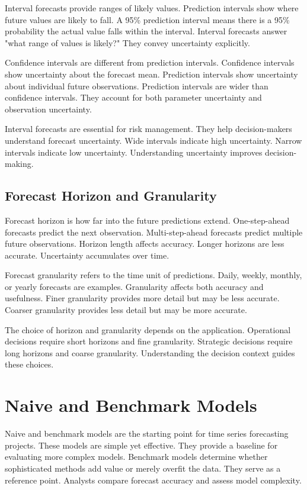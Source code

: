 Interval forecasts provide ranges of likely values. Prediction intervals show where future values are likely to fall. A 95\% prediction interval means there is a 95\% probability the actual value falls within the interval. Interval forecasts answer "what range of values is likely?" They convey uncertainty explicitly.

Confidence intervals are different from prediction intervals. Confidence intervals show uncertainty about the forecast mean. Prediction intervals show uncertainty about individual future observations. Prediction intervals are wider than confidence intervals. They account for both parameter uncertainty and observation uncertainty.

Interval forecasts are essential for risk management. They help decision-makers understand forecast uncertainty. Wide intervals indicate high uncertainty. Narrow intervals indicate low uncertainty. Understanding uncertainty improves decision-making.

\subsection{Forecast Horizon and Granularity}

Forecast horizon is how far into the future predictions extend. One-step-ahead forecasts predict the next observation. Multi-step-ahead forecasts predict multiple future observations. Horizon length affects accuracy. Longer horizons are less accurate. Uncertainty accumulates over time.

Forecast granularity refers to the time unit of predictions. Daily, weekly, monthly, or yearly forecasts are examples. Granularity affects both accuracy and usefulness. Finer granularity provides more detail but may be less accurate. Coarser granularity provides less detail but may be more accurate.

The choice of horizon and granularity depends on the application. Operational decisions require short horizons and fine granularity. Strategic decisions require long horizons and coarse granularity. Understanding the decision context guides these choices.

\section{Naive and Benchmark Models}

Naive and benchmark models are the starting point for time series forecasting projects. These models are simple yet effective. They provide a baseline for evaluating more complex models. Benchmark models determine whether sophisticated methods add value or merely overfit the data. They serve as a reference point. Analysts compare forecast accuracy and assess model complexity.

